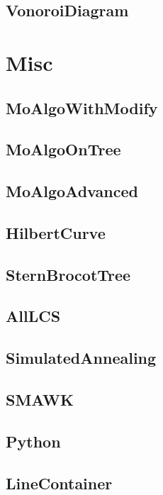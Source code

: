 	\subsection{VonoroiDiagram}
	
\section{Misc}
	\subsection{MoAlgoWithModify}
	
	\subsection{MoAlgoOnTree}
	
	\subsection{MoAlgoAdvanced}
	
	\subsection{HilbertCurve}
	
	\subsection{SternBrocotTree}
	
	\subsection{AllLCS}
	
	\subsection{SimulatedAnnealing}
	
	\subsection{SMAWK}
	
	\subsection{Python}
	
	\subsection{LineContainer}
	
